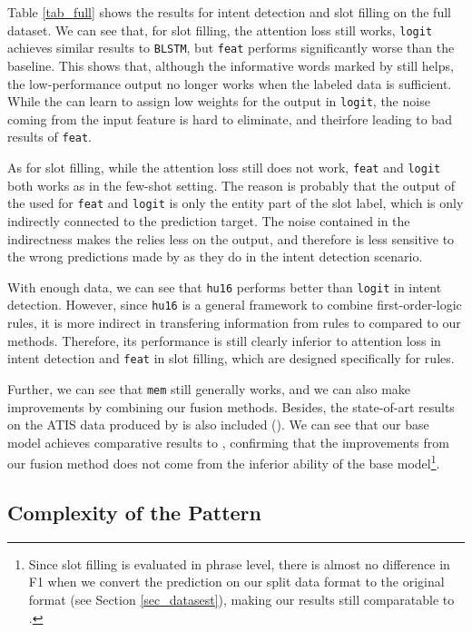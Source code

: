 Table \ref{tab_full} shows the results for intent detection and slot filling on the full dataset. We can see that, for slot filling, the attention loss still works, \texttt{logit} achieves similar results to \texttt{BLSTM}, but \texttt{feat} performs significantly worse than the baseline. This shows that, although the informative words marked by \RE still helps, the low-performance \RE output no longer works when the labeled data is sufficient. While the \NN can learn to assign low weights for the \RE output in \texttt{logit}, the noise coming from the input feature is hard to eliminate, and theirfore leading to bad results of \texttt{feat}.

As for slot filling, while the attention loss still does not work, \texttt{feat} and \texttt{logit} both works as in the few-shot setting. The reason is probably that the output of the \RE used for \texttt{feat} and \texttt{logit} is only the entity part of the slot label, which is only indirectly connected to the prediction target. The noise contained in the indirectness makes the \NN relies less on the \RE output, and therefore is less sensitive to the wrong predictions made by \RE as they do in the intent detection scenario.

With enough data, we can see that \texttt{hu16} performs better than \texttt{logit} in intent detection. 
However, since \texttt{hu16} is a general framework to combine first-order-logic rules, it is more indirect in transfering information from rules to \NN compared to our methods. Therefore, its performance is still clearly inferior to attention loss in intent detection and \texttt{feat} in slot filling, which are designed specifically for \RE rules.

Further, we can see that \texttt{mem} still generally works, and we can also make improvements by combining our fusion methods. Besides, the state-of-art results on the ATIS data produced by \cite{liu2016attention} is also included (\LL). We can see that our base \BLSTM model achieves comparative results to \LL, confirming that the improvements from our fusion method does not come from the inferior ability of the base model\footnote{Since slot filling is evaluated in phrase level, there is almost no difference in F1 when we convert the prediction on our split data format to the original format (see Section \ref{sec_datasest}), making our results still comparatable to \LL.}.

\subsection{Complexity of the Pattern}

